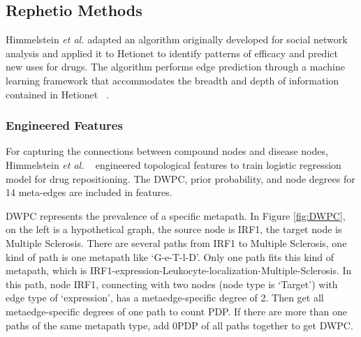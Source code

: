 \subsection{Rephetio Methods}

Himmelstein \textit{et al.} adapted an algorithm originally developed for social network analysis and applied it to Hetionet to identify patterns of efficacy and predict new uses for drugs. The algorithm performs edge prediction through a machine learning framework that accommodates the breadth and depth of information contained in Hetionet ~\cite{himmelstein_heterogeneous_2015}.

\subsubsection{Engineered Features}

For capturing the connections between compound nodes and disease nodes, Himmelstein \textit{et al.} ~\cite{himmelstein_systematic_2017} engineered topological features to train logistic regression model for drug repositioning. The \ac{DWPC}, prior probability, and node degrees for 14 meta-edges are included in features.

\ac{DWPC} represents the prevalence of a specific metapath. In Figure \ref{fig:DWPC}, on the left is a hypothetical graph, the source node is IRF1, the target node is Multiple Sclerosis. There are several paths from IRF1 to Multiple Sclerosis, one kind of path is one metapath like ‘G-e-T-l-D’. Only one path fits this kind of metapath, which is IRF1-expression-Leukocyte-localization-Multiple-Sclerosis. In this path, node IRF1, connecting with two nodes (node type is ‘Target’) with edge type of ‘expression’, has a metaedge-specific degree of 2. Then get all metaedge-specific degrees of one path to count \ac{PDP}. If there are more than one paths of the same metapath type, add 0\ac{PDP} of all paths together to get \ac{DWPC}.

